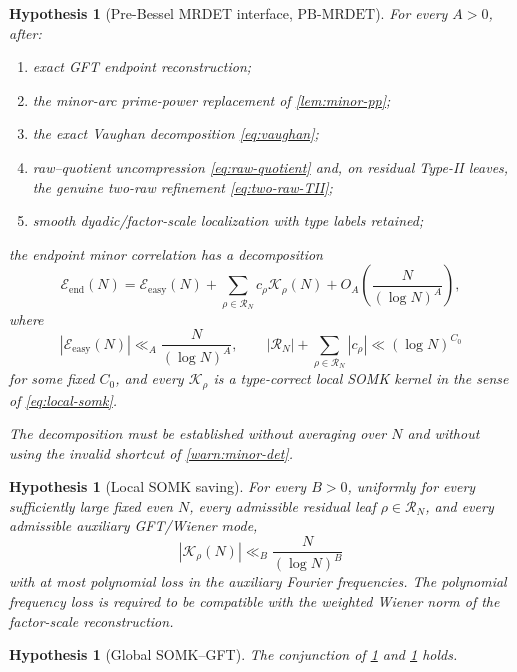 \documentclass[11pt]{article}
\newtheorem{hypothesis}[theorem]{Hypothesis}
\theoremstyle{definition}
\theoremstyle{remark}
\newcommand{\1}{\mathbf 1}
\newcommand{\PBM}{\mathrm{PB}\text{-}\mathrm{MRDET}}
\newcommand{\Kl}{\mathcal K}
\newcommand{\Eend}{\mathcal E_{\mathrm{end}}}
\newcommand{\Eeasy}{\mathcal E_{\mathrm{easy}}}
\begin{document}
\begin{hypothesis}[Pre-Bessel MRDET interface, \(\PBM\)]\label{hyp:pbm}
For every \(A>0\), after:
\begin{enumerate}[label=\textup{(I\arabic*)},leftmargin=2.7em]
\item exact GFT endpoint reconstruction;
\item the minor-arc prime-power replacement of \cref{lem:minor-pp};
\item the exact Vaughan decomposition \eqref{eq:vaughan};
\item raw--quotient uncompression \eqref{eq:raw-quotient} and, on residual Type-II leaves, the genuine two-raw refinement \eqref{eq:two-raw-TII};
\item smooth dyadic/factor-scale localization with type labels retained;
\end{enumerate}
the endpoint minor correlation has a decomposition
\begin{equation}\label{eq:pbm-decomp}
 \Eend(N)
 =\Eeasy(N)
 +\sum_{\rho\in\mathscr R_N}c_\rho\Kl_\rho(N)
 +O_A\!\left(\frac{N}{(\log N)^A}\right),
\end{equation}
where
\[
 |\Eeasy(N)|\ll_A\frac{N}{(\log N)^A},
 \qquad
 |\mathscr R_N|+\sum_{\rho\in\mathscr R_N}|c_\rho|
 \ll (\log N)^{C_0}
\]
for some fixed \(C_0\), and every \(\Kl_\rho\) is a type-correct local SOMK kernel in the sense of \eqref{eq:local-somk}.

The decomposition must be established without averaging over \(N\) and without using the invalid shortcut of \cref{warn:minor-det}.
\end{hypothesis}

\begin{hypothesis}[Local SOMK saving]\label{hyp:local-somk}
For every \(B>0\), uniformly for every sufficiently large fixed even \(N\), every admissible residual leaf \(\rho\in\mathscr R_N\), and every admissible auxiliary GFT/Wiener mode,
\begin{equation}\label{eq:local-somk-bound}
 \boxed{
 |\Kl_\rho(N)|
 \ll_{B}\frac{N}{(\log N)^B}}
\end{equation}
with at most polynomial loss in the auxiliary Fourier frequencies.  The polynomial frequency loss is required to be compatible with the weighted Wiener norm of the factor-scale reconstruction.
\end{hypothesis}

\begin{hypothesis}[Global SOMK--GFT]\label{hyp:global-somk}
The conjunction of \cref{hyp:pbm} and \cref{hyp:local-somk} holds.
\end{hypothesis}
\end{document}
